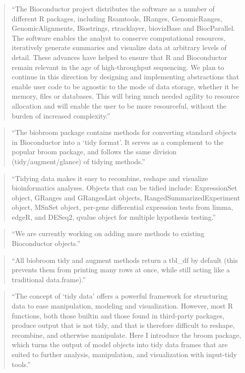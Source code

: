 \documentclass[]{tufte-book}
\begin{document}
\begin{quote}
``The Bioconductor project distributes the software as a number of different R
packages, including Rsamtools, IRanges, GenomicRanges, GenomicAlignments,
Biostrings, rtracklayer, biovizBase and BiocParallel. The software enables the
analyst to conserve computational resources, iteratively generate summaries and
visualize data at arbitrary levels of detail. These advances have helped to
ensure that R and Bioconductor remain relevant in the age of high-throughput
sequencing. We plan to continue in this direction by designing and implementing
abstractions that enable user code to be agnostic to the mode of data storage,
whether it be memory, files or databases. This will bring much needed agility to
resource allocation and will enable the user to be more resourceful, without the
burden of increased complexity.'' \citep{lawrence2014scalable}
\end{quote}

\begin{quote}
``The biobroom package contains methods for converting standard objects in Bioconductor into a `tidy format'. It serves as a complement to the popular broom package, and follows the same division (tidy/augment/glance) of tidying methods.''
\citep{biobroom}
\end{quote}

\begin{quote}
``Tidying data makes it easy to recombine, reshape and visualize bioinformatics analyses. Objects that can be tidied include: ExpressionSet object,
GRanges and GRangesList objects, RangedSummarizedExperiment object, MSnSet object,
per-gene differential expression tests from limma, edgeR, and DESeq2, qvalue object for multiple hypothesis testing.'' \citep{biobroom}
\end{quote}

\begin{quote}
``We are currently working on adding more methods to existing Bioconductor objects.'' \citep{biobroom}
\end{quote}

\begin{quote}
``All biobroom tidy and augment methods return a tbl\_df by default (this prevents them from printing many rows at once, while still acting like a traditional data.frame).'' \citep{biobroom}
\end{quote}

\begin{quote}
``The concept of `tidy data' offers a powerful framework for structuring data
to ease manipulation, modeling and visualization. However, most R functions,
both those builtin and those found in third-party packages, produce output that
is not tidy, and that is therefore difficult to reshape, recombine, and
otherwise manipulate. Here I introduce the broom package, which turns the output
of model objects into tidy data frames that are suited to further analysis,
manipulation, and visualization with input-tidy tools.'' \citep{robinson2014broom}
\end{quote}
\end{document}
